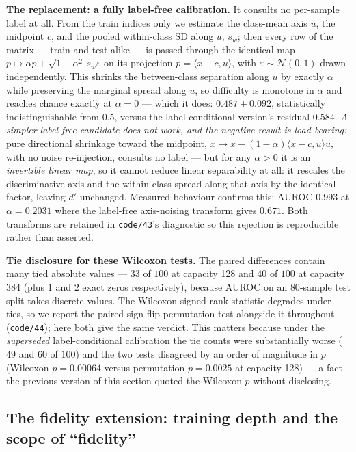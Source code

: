 \documentclass[10pt]{article} %
\begin{document}
\textbf{The replacement: a fully label-free calibration.} It consults no
per-sample label at all. From the train indices only we estimate the class-mean
axis $u$, the midpoint $c$, and the pooled within-class SD along $u$, $s_w$;
then every row of the matrix --- train and test alike --- is passed through the
identical map $p\mapsto\alpha p+\sqrt{1-\alpha^{2}}\,s_w\varepsilon$ on its
projection $p=\langle x-c,u\rangle$, with $\varepsilon\sim\mathcal{N}(0,1)$
drawn independently. This shrinks the between-class separation along $u$ by
exactly $\alpha$ while preserving the marginal spread along $u$, so difficulty
is monotone in $\alpha$ and reaches chance exactly at $\alpha=0$ --- which it
does: $0.487\pm0.092$, statistically indistinguishable from $0.5$, versus the
label-conditional version's residual $0.584$. \emph{A simpler label-free
candidate does not work, and the negative result is load-bearing:} pure
directional shrinkage toward the midpoint,
$x\mapsto x-(1-\alpha)\langle x-c,u\rangle u$, with no noise re-injection,
consults no label --- but for any $\alpha>0$ it is an \emph{invertible linear
map}, so it cannot reduce linear separability at all: it rescales the
discriminative axis and the within-class spread along that axis by the
identical factor, leaving $d'$ unchanged. Measured behaviour confirms this:
AUROC $0.993$ at $\alpha=0.2031$ where the label-free axis-noising transform
gives $0.671$. Both transforms are retained in \texttt{code/43}'s diagnostic so
this rejection is reproducible rather than asserted.

\textbf{Tie disclosure for these Wilcoxon tests.} The paired differences
contain many tied absolute values --- $33$ of $100$ at capacity 128 and $40$ of
$100$ at capacity 384 (plus $1$ and $2$ exact zeros respectively), because
AUROC on an $80$-sample test split takes discrete values. The Wilcoxon
signed-rank statistic degrades under ties, so we report the paired sign-flip
permutation test alongside it throughout (\texttt{code/44}); here both give the
same verdict. This matters because under the \emph{superseded}
label-conditional calibration the tie counts were substantially worse ($49$ and
$60$ of $100$) and the two tests disagreed by an order of magnitude in $p$
(Wilcoxon $p=0.00064$ versus permutation $p=0.0025$ at capacity 128) --- a fact
the previous version of this section quoted the Wilcoxon $p$ without
disclosing.

\subsection{The fidelity extension: training depth and the scope of ``fidelity''}
\end{document}
